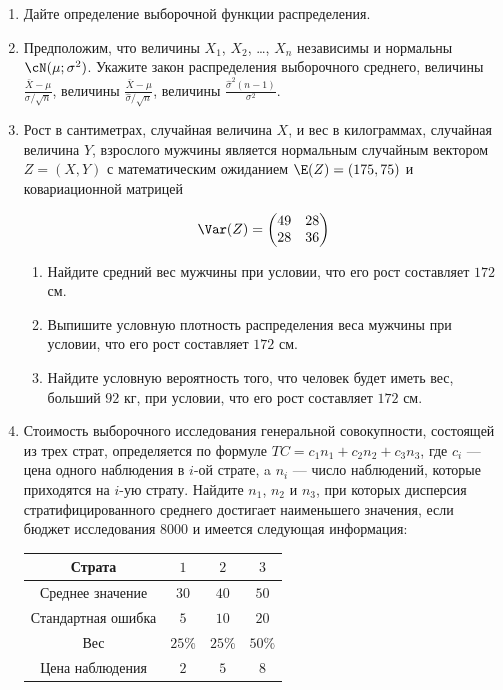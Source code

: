 	\begin{enumerate}
	\item Дайте определение выборочной функции распределения.
	\item Предположим, что величины $X_1$, $X_2$, \ldots, $X_n$ независимы и нормальны $\cN(\mu;\sigma^2)$. Укажите закон распределения выборочного среднего, величины $\frac{\bar X - \mu}{\sigma/\sqrt{n}}$, величины $\frac{\bar X - \mu}{\hat\sigma/\sqrt{n}}$, величины $\frac{\hat\sigma^2(n-1)}{\sigma^2}$.
	\item Рост в сантиметрах, случайная величина $X$, и вес в килограммах, случайная величина $Y$, взрослого мужчины является нормальным случайным вектором $Z = (X, Y)$ с математическим ожиданием $\E(Z) = (175, 75)$ и ковариационной матрицей

	\[
	\Var(Z) =
	\begin{pmatrix}
	49 & 28 \\
	28 & 36
	\end{pmatrix}
	\]

	\begin{enumerate}
		\item Найдите средний вес мужчины при условии, что его рост составляет $172$ см.
		\item Выпишите условную плотность распределения веса мужчины при условии, что его рост составляет $172$ см.
		\item Найдите условную вероятность того, что человек будет иметь вес, больший $92$ кг, при условии, что его рост составляет $172$ см.
	\end{enumerate}

	\item Стоимость выборочного исследования генеральной совокупности, состоящей из трех страт, определяется по формуле $TC = c_1n_1 + c_2n_2 + c_3n_3$, где $c_i$ — цена одного наблюдения в $i$-ой страте, a $n_i$ — число наблюдений, которые приходятся на $i$-ую страту. Найдите $n_1$, $n_2$ и $n_3$, при которых дисперсия стратифицированного среднего достигает наименьшего значения, если бюджет исследования 8000 и имеется следующая информация:

	\begin{center}
		\begin{tabular}{cccc}
			\toprule
			Страта & $1$ & $2$ & $3$  \\
			\midrule
			Среднее значение & $30$ & $40$ & $50$ \\
			Стандартная ошибка  & $5$ & $10$ & $20$ \\
			Вес & $25\%$ & $25\%$ & $50\%$ \\
			Цена наблюдения & $2$ & $5$ & $8$ \\
			\bottomrule
		\end{tabular}
	\end{center}
	\end{enumerate}



